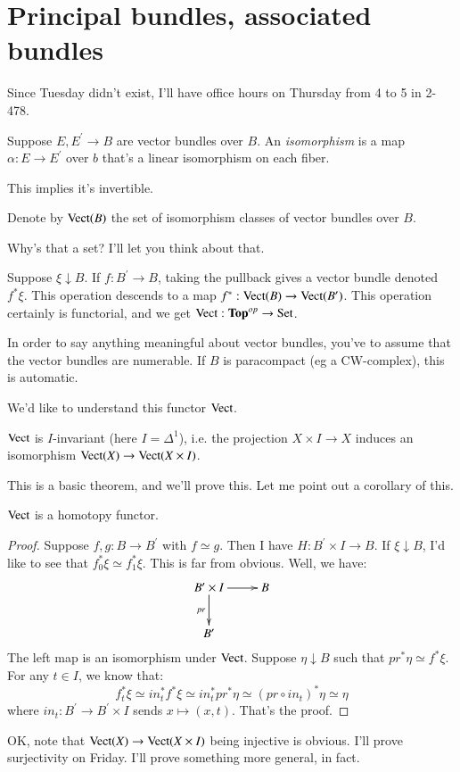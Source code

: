 \section{Principal bundles, associated bundles}
Since Tuesday didn't exist, I'll have office hours on Thursday from 4 to 5 in 2-478.
\begin{definition}
    Suppose $E,E^\prime\to B$ are vector bundles over $B$. An \emph{isomorphism} is a map $\alpha:E\to E^\prime$ over $b$ that's a linear isomorphism on each fiber.
\end{definition}
This implies it's invertible.
\begin{notation}
    Denote by $\operatorname{Vect}(B)$ the set of isomorphism classes of vector bundles over $B$.
\end{notation}
Why's that a set? I'll let you think about that.

Suppose $\xi\downarrow B$. If $f:B^\prime\to B$, taking the pullback gives a vector bundle denoted $f^\ast\xi$. This operation descends to a map $f^\ast:\operatorname{Vect}(B)\to \operatorname{Vect}(B^\prime)$. This operation certainly is functorial, and we get $\operatorname{Vect}:\mathbf{Top}^{op}\to \mathrm{Set}$.
\begin{warning}
In order to say anything meaningful about vector bundles, you've to assume that the vector bundles are numerable. If $B$ is paracompact (eg a CW-complex), this is automatic.
\end{warning}
We'd like to understand this functor $\operatorname{Vect}$.
\begin{theorem}
    $\operatorname{Vect}$ is $I$-invariant (here $I = \Delta^1$), i.e. the projection $X\times I\to X$ induces an isomorphism $\operatorname{Vect}(X)\to \operatorname{Vect}(X\times I)$.
\end{theorem}
This is a basic theorem, and we'll prove this. Let me point out a corollary of this.
\begin{corollary}
    $\operatorname{Vect}$ is a homotopy functor.
\end{corollary}
\begin{proof}
    Suppose $f,g:B\to B^\prime$ with $f\simeq g$. Then I have $H:B^\prime\times I\to B$. If $\xi\downarrow B$, I'd like to see that $f^\ast_0\xi\simeq f_1^\ast\xi$. This is far from obvious. Well, we have:
    \begin{equation*}
	\xymatrix{
	    B^\prime\times I\ar[r]\ar[d]_{pr} & B\\
	    B^\prime & 
	    }
    \end{equation*}
    The left map is an isomorphism under $\operatorname{Vect}$. Suppose $\eta\downarrow B$ such that $pr^\ast\eta \simeq f^\ast\xi$.
    For any $t\in I$, we know that:
    $$f_t^\ast\xi \simeq in_t^\ast f^\ast\xi \simeq in_t^\ast pr^\ast\eta \simeq (pr\circ in_t)^\ast\eta \simeq \eta$$
    where $in_t:B^\prime\to B^\prime\times I$ sends $x\mapsto(x,t)$. That's the proof.
\end{proof}
OK, note that $\operatorname{Vect}(X)\to \operatorname{Vect}(X\times I)$ being injective is obvious. I'll prove surjectivity on Friday. I'll prove something more general, in fact.
